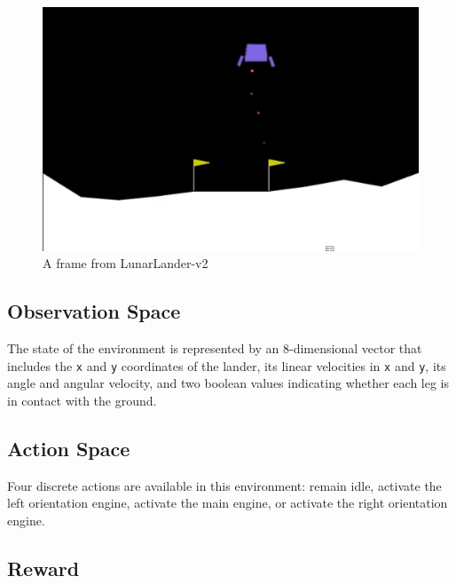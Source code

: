 \documentclass{article} %
\begin{document}
\begin{figure}[h]
    \begin{center}
        \includegraphics[width=\textwidth]{lunar_lander.png}
    \end{center}
    \caption{A frame from LunarLander-v2}
    \label{fig:mcar-rendering}
\end{figure}

\subsection{Observation Space}
The state of the environment is represented by an 8-dimensional vector that includes the \verb|x| and \verb|y| coordinates of the lander, its linear velocities in \verb|x| and \verb|y|, its angle and angular velocity, and two boolean values indicating whether each leg is in contact with the ground.

\subsection{Action Space}
Four discrete actions are available in this environment: remain idle, activate the left orientation engine, activate the main engine, or activate the right orientation engine.

\subsection{Reward}
\end{document}
